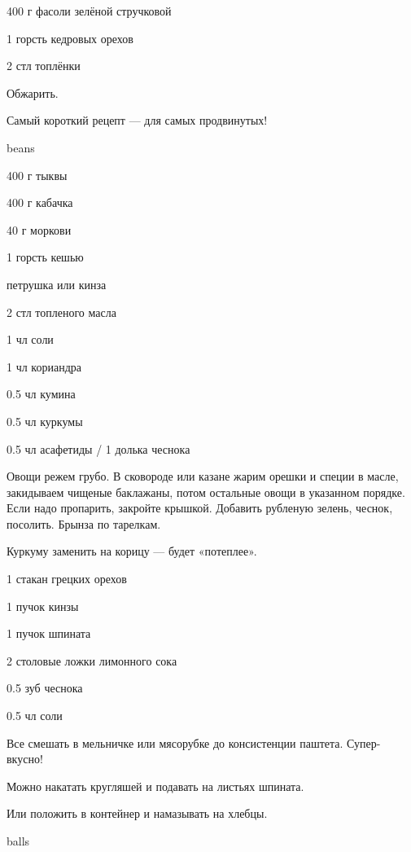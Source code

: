 {
\item 400 г фасоли зелёной стручковой
\item 1 горсть кедровых орехов
\item 2 стл топлёнки
}{
\item[]
}{
Обжарить.
}{
\begin{advice}
\item Самый короткий рецепт — для самых продвинутых!
\end{advice}}{beans}



{
\item 400 г тыквы
\item 400 г кабачка
\item 40 г моркови
\item 1 горсть кешью
\item петрушка или кинза
\item 2 стл топленого масла
}{
\item 1 чл соли
\item 1 чл кориандра
\item 0.5 чл кумина
\item 0.5 чл куркумы
\item 0.5 чл асафетиды / 1 долька чеснока
}{
Овощи режем грубо. В сковороде или казане жарим орешки и специи в масле, закидываем чищеные баклажаны, потом остальные овощи в указанном порядке. Если надо пропарить, закройте крышкой. Добавить рубленую зелень, чеснок, посолить. Брынза по тарелкам.
}{
\begin{advice}
\item Куркуму заменить на корицу — будет «потеплее».
\end{advice}}{}



{
\item 1 стакан грецких орехов
\item 1 пучок кинзы
\item 1 пучок шпината
\item 2 столовые ложки лимонного сока
}{
\item 0.5 зуб чеснока
\item 0.5 чл соли
}{
Все смешать в мельничке или мясорубке до консистенции паштета. Супер-вкусно!
}{
\begin{advice}
\item Можно накатать кругляшей и подавать на листьях шпината.
\item Или положить в контейнер и намазывать на хлебцы.
\end{advice}}{balls}



